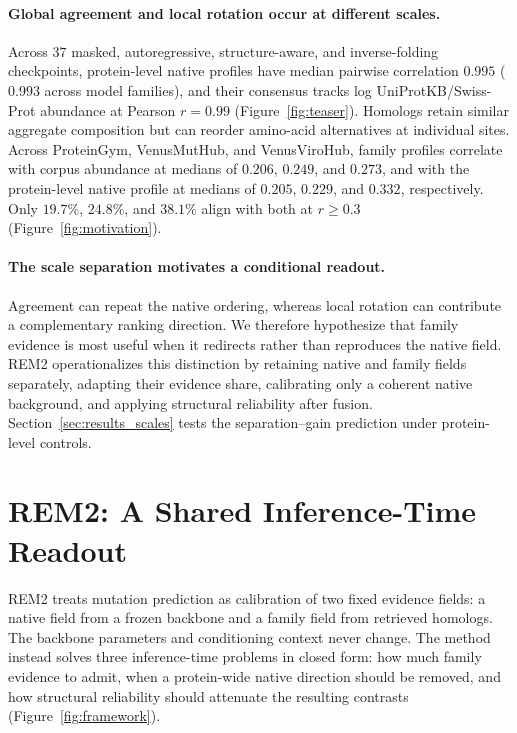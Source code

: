 \documentclass{article} %
\begin{document}
\paragraph{Global agreement and local rotation occur at different scales.}
Across $37$ masked, autoregressive, structure-aware, and inverse-folding checkpoints, protein-level native profiles have median pairwise correlation $0.995$ ($0.993$ across model families), and their consensus tracks log UniProtKB/Swiss-Prot abundance at Pearson $r=0.99$ (Figure~\ref{fig:teaser}). Homologs retain similar aggregate composition but can reorder amino-acid alternatives at individual sites. Across ProteinGym, VenusMutHub, and VenusViroHub, family profiles correlate with corpus abundance at medians of $0.206$, $0.249$, and $0.273$, and with the protein-level native profile at medians of $0.205$, $0.229$, and $0.332$, respectively. Only $19.7\%$, $24.8\%$, and $38.1\%$ align with both at $r\geq0.3$ (Figure~\ref{fig:motivation}).

\paragraph{The scale separation motivates a conditional readout.}
Agreement can repeat the native ordering, whereas local rotation can contribute a complementary ranking direction. We therefore hypothesize that family evidence is most useful when it redirects rather than reproduces the native field. \textsc{REM2} operationalizes this distinction by retaining native and family fields separately, adapting their evidence share, calibrating only a coherent native background, and applying structural reliability after fusion. Section~\ref{sec:results_scales} tests the separation--gain prediction under protein-level controls.

\section{\textsc{REM2}: A Shared Inference-Time Readout}
\label{sec:method}

\textsc{REM2} treats mutation prediction as calibration of two fixed evidence fields: a native field from a frozen backbone and a family field from retrieved homologs. The backbone parameters and conditioning context never change. The method instead solves three inference-time problems in closed form: how much family evidence to admit, when a protein-wide native direction should be removed, and how structural reliability should attenuate the resulting contrasts (Figure~\ref{fig:framework}).
\end{document}
